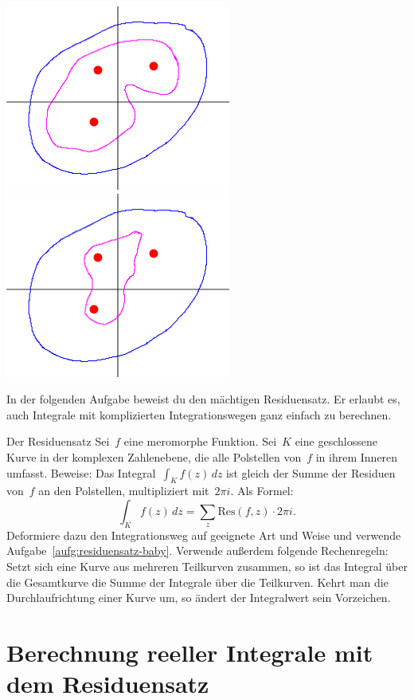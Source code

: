 \documentclass[twoside]{../zirkelblatt1415}
\theoremstyle{definition}
\theoremstyle{plain}
\theoremstyle{remark}
\newcommand{\Res}{\mathrm{Res}}
\begin{document}
\begin{center}
\includegraphics[scale=0.75]{path-independence-1}\qquad\qquad
\includegraphics[scale=0.75]{path-independence-2}
\end{center}

In der folgenden Aufgabe beweist du den mächtigen Residuensatz. Er erlaubt es,
auch Integrale mit komplizierten Integrationswegen ganz einfach zu berechnen.
\begin{aufgabe}{Der Residuensatz}
Sei~$f$ eine meromorphe Funktion. Sei~$K$ eine geschlossene Kurve in der
komplexen Zahlenebene, die alle Polstellen von~$f$ in ihrem Inneren umfasst.
Beweise: Das Integral~$\int_K f(z) \,dz$ ist gleich der Summe der Residuen
von~$f$ an den Polstellen, multipliziert mit~$2 \pi i$. Als Formel:
\[ \int_K f(z) \,dz = \sum_z \Res(f,z) \cdot 2 \pi i. \]
Deformiere dazu den Integrationsweg auf geeignete Art und Weise und verwende
Aufgabe~\ref{aufg:residuensatz-baby}. Verwende außerdem folgende Rechenregeln:
Setzt sich eine Kurve aus mehreren Teilkurven zusammen, so ist das Integral
über die Gesamtkurve die Summe der Integrale über die Teilkurven. Kehrt man die
Durchlaufrichtung einer Kurve um, so ändert der Integralwert sein Vorzeichen.
\end{aufgabe}


\section{Berechnung reeller Integrale mit dem Residuensatz}
\end{document}
